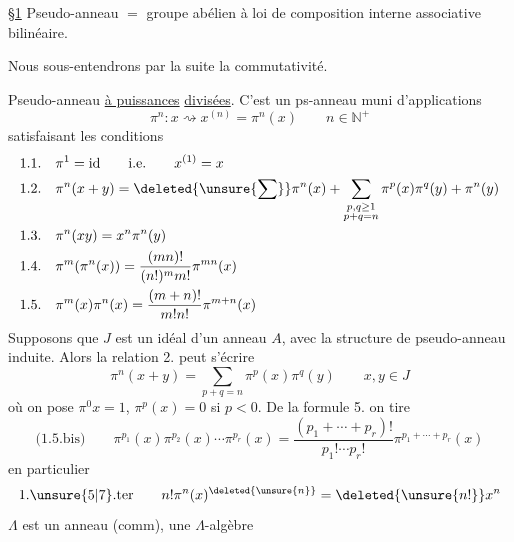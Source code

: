\uline{\S1} Pseudo-anneau $=$ groupe abélien à loi de composition interne associative bilinéaire.

Nous sous-entendrons par la suite la commutativité.

Pseudo-anneau  \uline{à puissances} \uline{divisées}. C'est un ps-anneau muni d'applications 
\[
\pi^n:x\rightsquigarrow x^{(n)}=\pi^n(x)\qquad n\in\mathbb N^+
\]
satisfaisant les conditions
\[
\begin{aligned}
1.1.\quad&\pi^1=\mathrm{id}\qquad\text{i.e.}\qquad x^{(1)}=x\\
1.2.\quad&\pi^n(x+y)=\deleted{\unsure{\sum}}\pi^n(x)+\sum_{\substack{p,q\ge1\\p+q=n}}\pi^p(x)\pi^q(y)+\pi^n(y)\\
1.3.\quad&\pi^n(xy)=x^n\pi^n(y)\\
1.4.\quad&\pi^m(\pi^n(x))=\frac{(mn)!}{(n!)^m m!}\pi^{mn}(x)\\
1.5.\quad&\pi^m(x)\pi^n(x)=\frac{(m+n)!}{m!n!}\pi^{m+n}(x)
\end{aligned}
\]
Supposons que $J$ est un idéal d'un anneau $A$, avec la structure de pseudo-anneau induite. Alors la relation 2. peut s'écrire
\[
\pi^n(x+y)=\sum_{p+q=n}\pi^p(x)\pi^q(y)\qquad x,y\in J
\]
où on pose $\pi^0x=1$, $\pi^p(x)=0$ si $p<0$. De la formule 5. on tire
\[
\text{(1.5.bis)}\qquad\pi^{p_1}(x)\pi^{p_2}(x)\cdots\pi^{p_r}(x)=\frac{(p_1+\cdots+p_r)!}{p_1!\cdots p_r!}\pi^{p_1+\cdots+p_r}(x)
\]
en particulier
\[
\text{1.\unsure{5|7}.ter}\qquad n!\pi^n(x)^{\deleted{\unsure{n}}}=\deleted{\unsure{n!}}x^n
\]
 $\Lambda$ est un anneau (comm), une $\Lambda$-algèbre
